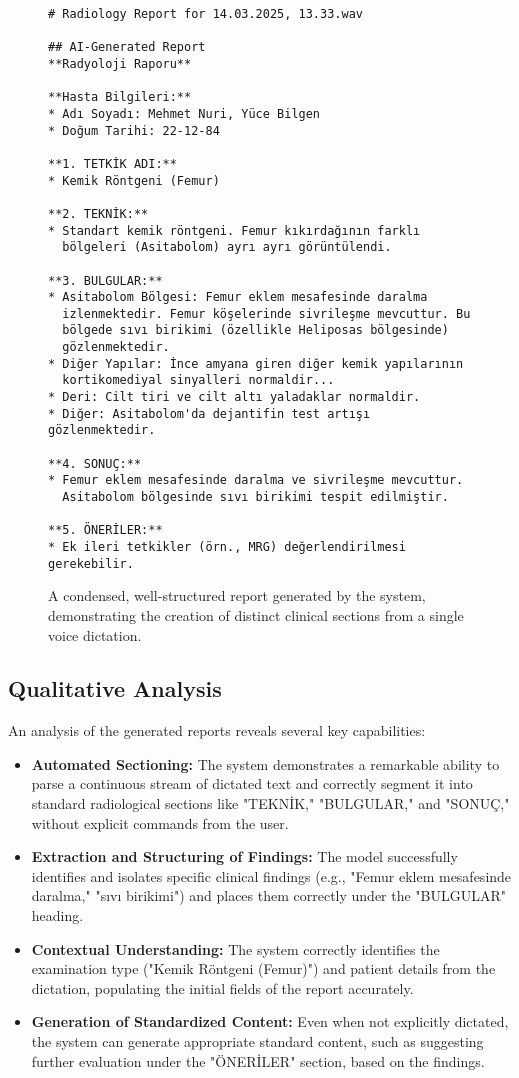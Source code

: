 \begin{figure}[!htbp]
    \centering
    \begin{verbatim}
# Radiology Report for 14.03.2025, 13.33.wav

## AI-Generated Report
**Radyoloji Raporu**

**Hasta Bilgileri:**
* Adı Soyadı: Mehmet Nuri, Yüce Bilgen
* Doğum Tarihi: 22-12-84

**1. TETKİK ADI:**
* Kemik Röntgeni (Femur)

**2. TEKNİK:**
* Standart kemik röntgeni. Femur kıkırdağının farklı 
  bölgeleri (Asitabolom) ayrı ayrı görüntülendi.

**3. BULGULAR:**
* Asitabolom Bölgesi: Femur eklem mesafesinde daralma 
  izlenmektedir. Femur köşelerinde sivrileşme mevcuttur. Bu 
  bölgede sıvı birikimi (özellikle Heliposas bölgesinde) 
  gözlenmektedir.
* Diğer Yapılar: İnce amyana giren diğer kemik yapılarının 
  kortikomediyal sinyalleri normaldir...
* Deri: Cilt tiri ve cilt altı yaladaklar normaldir.
* Diğer: Asitabolom'da dejantifin test artışı gözlenmektedir.

**4. SONUÇ:**
* Femur eklem mesafesinde daralma ve sivrileşme mevcuttur. 
  Asitabolom bölgesinde sıvı birikimi tespit edilmiştir.

**5. ÖNERİLER:**
* Ek ileri tetkikler (örn., MRG) değerlendirilmesi gerekebilir.
    \end{verbatim}
    \caption{A condensed, well-structured report generated by the system, demonstrating the creation of distinct clinical sections from a single voice dictation.}
    \label{fig:sample_report_2}
\end{figure}

\subsection{Qualitative Analysis}
An analysis of the generated reports reveals several key capabilities:
\begin{itemize}
    \item \textbf{Automated Sectioning:} The system demonstrates a remarkable ability to parse a continuous stream of dictated text and correctly segment it into standard radiological sections like "TEKNİK," "BULGULAR," and "SONUÇ," without explicit commands from the user.
    \item \textbf{Extraction and Structuring of Findings:} The model successfully identifies and isolates specific clinical findings (e.g., "Femur eklem mesafesinde daralma," "sıvı birikimi") and places them correctly under the "BULGULAR" heading.
    \item \textbf{Contextual Understanding:} The system correctly identifies the examination type ("Kemik Röntgeni (Femur)") and patient details from the dictation, populating the initial fields of the report accurately.
    \item \textbf{Generation of Standardized Content:} Even when not explicitly dictated, the system can generate appropriate standard content, such as suggesting further evaluation under the "ÖNERİLER" section, based on the findings.
\end{itemize}

